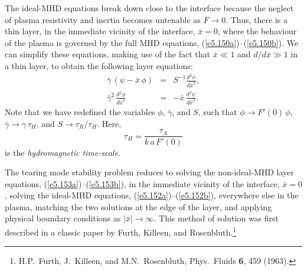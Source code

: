 The ideal-MHD equations break down close to the interface because the neglect
of plasma resistivity and inertia becomes untenable as $F\rightarrow 0$.
Thus, there is a thin layer, in the immediate vicinity
of the interface, $\bar{x}=0$, where the behaviour of the plasma is governed
by the full MHD equations, (\ref{e5.150a})--(\ref{e5.150b}). We can simplify these equations,
making use of the fact that $\bar{x}\ll 1$ and $d/d\bar{x} \gg 1$ in a
thin layer, to obtain the following layer equations:
\begin{eqnarray}\label{e5.153a}
\bar{\gamma}\,(\psi - \bar{x}\,\phi) &=& S^{-1}\frac{d^2\psi}{d\bar{x}^2},\\[0.5ex]
\bar{\gamma}^2\,\frac{d^2\phi}{d\bar{x}^2} &=& - \bar{x}\,\frac{d^2\psi}{d\bar{x}^2}.\label{e5.153b}
\end{eqnarray}
Note that we have redefined the variables $\phi$, $\bar{\gamma}$, and $S$, such
that $\phi\rightarrow F'(0)\,\phi$, $\bar{\gamma}\rightarrow \gamma\,\tau_H$,
and $S\rightarrow \tau_R/\tau_H$. Here,
\begin{equation}
\tau_H = \frac{\tau_A}{k\,a\,F'(0)}
\end{equation}
is the {\em hydromagnetic time-scale}.

The tearing mode stability problem reduces to solving the non-ideal-MHD layer equations,
(\ref{e5.153a})--(\ref{e5.153b}), in the immediate vicinity of the interface, $\bar{x}=0$, solving
the ideal-MHD equations, (\ref{e5.152a})--(\ref{e5.152b}), everywhere else in the plasma, matching
the two solutions at the edge of the layer, and applying physical
boundary conditions as $|\bar{x}|\rightarrow\infty$. This method
of solution was first described in a classic paper by Furth, Killeen, and
Rosenbluth.\footnote{H.P.~Furth, J.~Killeen, and M.N.~Rosenbluth,
Phys.\ Fluids {\bf 6}, 459 (1963).}

